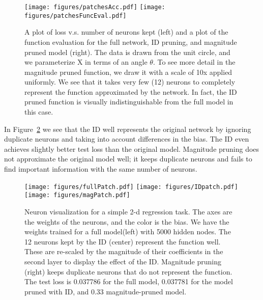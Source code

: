 \begin{figure}[!tbp]
\centering
  \texttt{[image: figures/patchesAcc.pdf]}
  \texttt{[image: figures/patchesFuncEval.pdf]}
\caption{A plot of loss v.s. number of neurons kept (left) and a plot of the function evaluation for the full network, ID pruning, and magnitude pruned model (right).  The data is drawn from the unit circle, and we parameterize X in terms of an angle $\theta$. To see more detail in the magnitude pruned function, we draw it with a scale of 10x applied uniformly.  We see that it takes very few (12) neurons to completely represent the function approximated by the network. In fact, the ID pruned function is visually indistinguishable from the full model in this case.  }
\label{fig:patchesBonus}
\end{figure}


In Figure~\ref{fig:patches} we see that the ID well represents the original network by ignoring duplicate neurons and taking into account differences in the bias.
The ID even achieves slightly better test loss than the original model.
Magnitude pruning does not approximate the original model well; it keeps duplicate neurons and fails to find important information with the same number of neurons.

\begin{figure}[!tbp]
\centering
  \texttt{[image: figures/fullPatch.pdf]}
  \texttt{[image: figures/IDpatch.pdf]}
  \texttt{[image: figures/magPatch.pdf]}
    \caption{Neuron visualization for a simple 2-d regression task. The axes are the weights of the neurons, and the color is the bias.  We have the weights trained for a full model(left) with 5000 hidden nodes.  The 12 neurons kept by the ID (center) represent the function well. These are re-scaled by the magnitude of their coefficients in the second layer to display the effect of the ID.  Magnitude pruning (right) keeps duplicate neurons that do not represent the function.  The test loss is 0.037786 for the full model, 0.037781 for the model pruned with ID, and 0.33 magnitude-pruned model. }
\label{fig:patches}
\end{figure}
  

